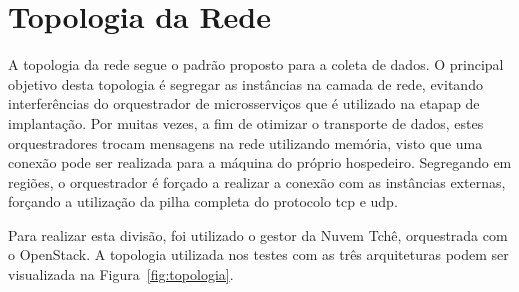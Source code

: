 \section{Topologia da Rede}
\label{sec:topologia}

A topologia da rede segue o padrão proposto para a coleta de dados.
%
O principal objetivo desta topologia é segregar as instâncias na camada de rede, evitando interferências do orquestrador de microsserviços que é utilizado na etapap de implantação.
%
Por muitas vezes, a fim de otimizar o transporte de dados, estes orquestradores trocam mensagens na rede utilizando memória, visto que uma conexão pode ser realizada para a máquina do próprio hospedeiro.
%
Segregando em regiões, o orquestrador é forçado a realizar a conexão com as instâncias externas, forçando a utilização da pilha completa do protocolo \ac{tcp} e \ac{udp}.

Para realizar esta divisão, foi utilizado o gestor da Nuvem Tchê, orquestrada com o OpenStack.
%
A topologia utilizada nos testes com as três arquiteturas podem ser visualizada na Figura~\ref{fig:topologia}.


